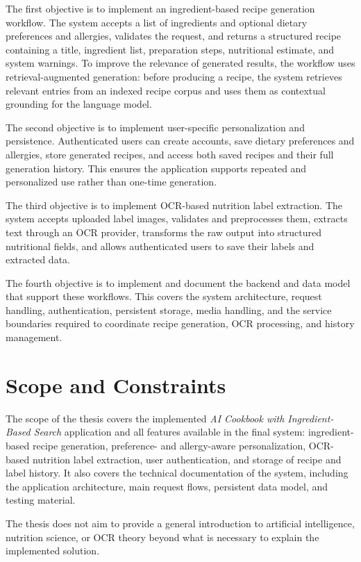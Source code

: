 The first objective is to implement an ingredient-based recipe generation
workflow. The system accepts a list of ingredients and optional dietary
preferences and allergies, validates the request, and returns a structured
recipe containing a title, ingredient list, preparation steps, nutritional
estimate, and system warnings. To improve the relevance of generated
results, the workflow uses retrieval-augmented generation: before producing
a recipe, the system retrieves relevant entries from an indexed recipe corpus
and uses them as contextual grounding for the language model.

The second objective is to implement user-specific personalization and
persistence. Authenticated users can create accounts, save dietary
preferences and allergies, store generated recipes, and access both saved
recipes and their full generation history. This ensures the application
supports repeated and personalized use rather than one-time generation.

The third objective is to implement OCR-based nutrition label extraction.
The system accepts uploaded label images, validates and preprocesses them,
extracts text through an OCR provider, transforms the raw output into
structured nutritional fields, and allows authenticated users to save their
labels and extracted data.

The fourth objective is to implement and document the backend and data model
that support these workflows. This covers the system architecture, request
handling, authentication, persistent storage, media handling, and the
service boundaries required to coordinate recipe generation, OCR
processing, and history management.

\section{Scope and Constraints}

The scope of the thesis covers the implemented \emph{AI Cookbook with
Ingredient-Based Search} application and all features available in the final
system: ingredient-based recipe generation, preference- and allergy-aware
personalization, OCR-based nutrition label extraction, user authentication,
and storage of recipe and label history. It also covers the technical
documentation of the system, including the application architecture, main
request flows, persistent data model, and testing material.

The thesis does not aim to provide a general introduction to artificial
intelligence, nutrition science, or OCR theory beyond what is necessary to
explain the implemented solution.

